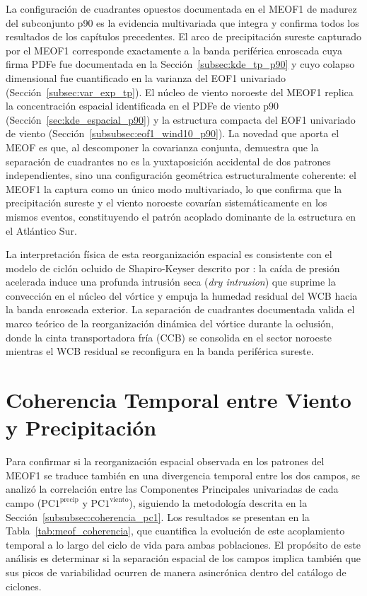 La configuración de cuadrantes opuestos documentada en el MEOF1 de madurez del subconjunto p90 es la evidencia multivariada que integra y confirma todos los resultados de los capítulos precedentes. 
El arco de precipitación sureste capturado por el MEOF1 corresponde exactamente a la banda periférica enroscada cuya firma PDFe fue documentada en la Sección~\ref{subsec:kde_tp_p90} y cuyo colapso dimensional fue cuantificado en la varianza del EOF1 univariado (Sección~\ref{subsec:var_exp_tp}).
El núcleo de viento noroeste del MEOF1 replica la concentración espacial identificada en el PDFe de viento p90 (Sección~\ref{sec:kde_espacial_p90}) y la estructura compacta del EOF1 univariado de viento (Sección~\ref{subsubsec:eof1_wind10_p90}). La novedad que aporta el MEOF es que, al descomponer la covarianza conjunta, demuestra que la separación de cuadrantes no es la yuxtaposición accidental de dos patrones independientes, sino una configuración geométrica estructuralmente coherente: el MEOF1 la captura como un único modo multivariado, lo que confirma que la precipitación sureste y el viento noroeste covarían sistemáticamente en los mismos eventos, constituyendo el patrón acoplado dominante de la estructura en el Atlántico Sur.

La interpretación física de esta reorganización espacial es consistente con el modelo de ciclón ocluido de Shapiro-Keyser descrito por \citet{schultz2021antecedents}: la caída de presión acelerada induce una profunda intrusión seca (\textit{dry intrusion}) que suprime la convección en el núcleo del vórtice y empuja la humedad residual del WCB hacia la banda enroscada exterior. La separación de cuadrantes documentada valida el marco teórico de la reorganización dinámica del vórtice durante la oclusión, donde la cinta transportadora fría (CCB) se consolida en el sector noroeste mientras el WCB residual se reconfigura en la banda periférica sureste.

\section{Coherencia Temporal entre Viento y Precipitación}
\label{sec:meof_coherencia}

Para confirmar si la reorganización espacial observada en los patrones del MEOF1 se traduce también en una divergencia temporal entre los dos campos, se analizó la correlación entre las Componentes Principales univariadas de cada campo ($\text{PC1}^{\text{precip}}$ y $\text{PC1}^{\text{viento}}$), siguiendo la metodología descrita en la Sección~\ref{subsubsec:coherencia_pc1}. Los resultados se presentan en la Tabla~\ref{tab:meof_coherencia}, que cuantifica la evolución de este acoplamiento temporal a lo largo del ciclo de vida para ambas poblaciones. El propósito de este análisis es determinar si la separación espacial de los campos implica también que sus picos de variabilidad ocurren de manera asincrónica dentro del catálogo de ciclones.

